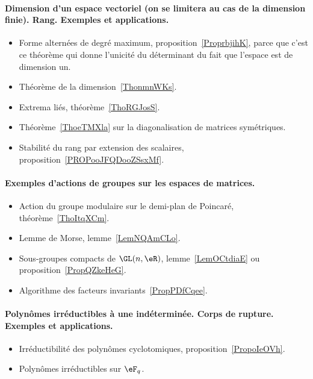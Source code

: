 \paragraph{Dimension d'un espace vectoriel (on se limitera au cas de la dimension finie). Rang. Exemples et applications.}
\begin{itemize}
    \item Forme alternées de degré maximum, proposition~\ref{ProprbjihK}, parce que c'est ce théorème qui donne l'unicité du déterminant du fait que l'espace est de dimension un.
    \item Théorème de la dimension~\ref{ThonmnWKs}.
    \item Extrema liés, théorème~\ref{ThoRGJosS}.
    \item Théorème~\ref{ThoeTMXla} sur la diagonalisation de matrices symétriques.
    \item Stabilité du rang par extension des scalaires, proposition~\ref{PROPooJFQDooZSsxMf}.
\end{itemize}
\paragraph{Exemples d'actions de groupes sur les espaces de matrices.}
\begin{itemize}
    \item Action du groupe modulaire sur le demi-plan de Poincaré, théorème~\ref{ThoItqXCm}.
    \item Lemme de Morse, lemme~\ref{LemNQAmCLo}.
    \item Sous-groupes compacts de \( \GL(n,\eR)\), lemme~\ref{LemOCtdiaE} ou proposition~\ref{PropQZkeHeG}.
    \item Algorithme des facteurs invariants~\ref{PropPDfCqee}.
\end{itemize}
\paragraph{Polynômes irréductibles à une indéterminée. Corps de rupture. Exemples et applications.}
\begin{itemize}
    \item Irréductibilité des polynômes cyclotomiques, proposition~\ref{PropoIeOVh}.
    \item Polynômes irréductibles sur \( \eF_q\).
\end{itemize}
